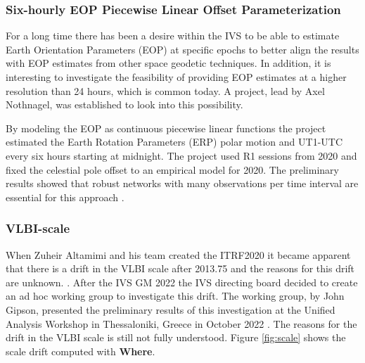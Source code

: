 \documentclass[twocolumn,twoside]{svmultivs_br} %
\begin{document}
\subsubsection{Six-hourly EOP Piecewise Linear
Offset Parameterization}
For a long time there has been a desire within the IVS to be able to estimate Earth Orientation Parameters
(EOP) at specific epochs to better align the results with EOP estimates from other space geodetic techniques.
In addition, it is interesting to investigate the feasibility of providing EOP estimates at a higher resolution
than 24 hours, which is common today. A project, lead by Axel Nothnagel, was established to look into this 
possibility. 

By modeling the EOP as continuous piecewise linear functions the project estimated the Earth Rotation Parameters
(ERP) polar motion and
UT1-UTC every six hours starting at midnight. The project used R1 sessions from 2020 and fixed the celestial pole
offset to an empirical model for 2020. The preliminary results showed that robust networks
with many observations per time interval are essential for this approach \cite{ivsgm2022-pwlo}.

\subsubsection{VLBI-scale}
When Zuheir Altamimi and his team created the ITRF2020 it became apparent that there is a drift in the 
VLBI scale after 2013.75 and the reasons for this drift are unknown. \cite{ivsgm2022-itrf2020}.
After the IVS GM 2022 the IVS directing board decided to create an ad hoc working group to investigate
this drift. The working group, by John 
Gipson, presented the preliminary results of this investigation at the Unified Analysis Workshop in 
Thessaloniki, Greece in October 2022 \cite{ivsnl-64}. The reasons for the drift in the VLBI scale is 
still not fully understood. Figure \ref{fig:scale} shows the scale drift computed with \textbf{Where}.
\end{document}

